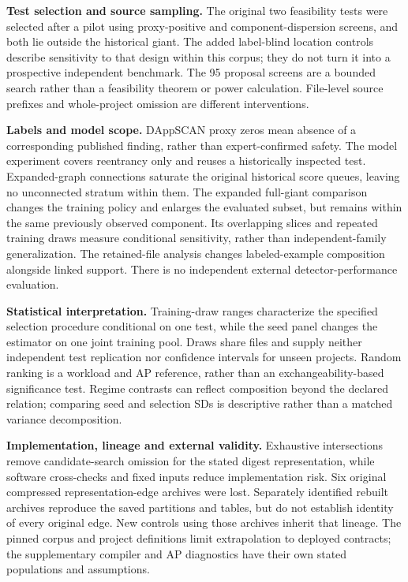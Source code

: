 \documentclass[preprint,12pt]{elsarticle}
\begin{document}
\textbf{Test selection and source sampling.} The original two feasibility tests were selected after a pilot using proxy-positive and component-dispersion screens, and both lie outside the historical giant. The added label-blind location controls describe sensitivity to that design within this corpus; they do not turn it into a prospective independent benchmark. The 95 proposal screens are a bounded search rather than a feasibility theorem or power calculation. File-level source prefixes and whole-project omission are different interventions.

\textbf{Labels and model scope.} DAppSCAN proxy zeros mean absence of a corresponding published finding, rather than expert-confirmed safety. The model experiment covers reentrancy only and reuses a historically inspected test. Expanded-graph connections saturate the original historical score queues, leaving no unconnected stratum within them. The expanded full-giant comparison changes the training policy and enlarges the evaluated subset, but remains within the same previously observed component. Its overlapping slices and repeated training draws measure conditional sensitivity, rather than independent-family generalization. The retained-file analysis changes labeled-example composition alongside linked support. There is no independent external detector-performance evaluation.

\textbf{Statistical interpretation.} Training-draw ranges characterize the specified selection procedure conditional on one test, while the seed panel changes the estimator on one joint training pool. Draws share files and supply neither independent test replication nor confidence intervals for unseen projects. Random ranking is a workload and AP reference, rather than an exchangeability-based significance test. Regime contrasts can reflect composition beyond the declared relation; comparing seed and selection SDs is descriptive rather than a matched variance decomposition.

\textbf{Implementation, lineage and external validity.} Exhaustive intersections remove candidate-search omission for the stated digest representation, while software cross-checks and fixed inputs reduce implementation risk. Six original compressed representation-edge archives were lost. Separately identified rebuilt archives reproduce the saved partitions and tables, but do not establish identity of every original edge. New controls using those archives inherit that lineage. The pinned corpus and project definitions limit extrapolation to deployed contracts; the supplementary compiler and AP diagnostics have their own stated populations and assumptions.
\end{document}
